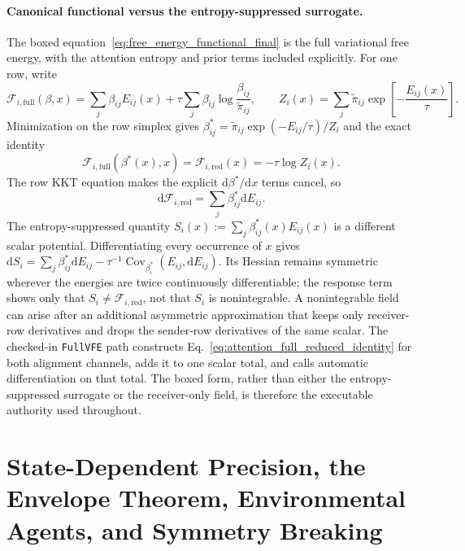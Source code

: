 \documentclass[11pt]{article}
\begin{document}
\paragraph{Canonical functional versus the entropy-suppressed surrogate.}
The boxed equation~\eqref{eq:free_energy_functional_final} is the full variational free energy, with the attention entropy and prior terms included explicitly. For one row, write
\begin{equation}
\mathcal{F}_{i,\mathrm{full}}(\beta,x)=\sum_j\beta_{ij}E_{ij}(x)+\tau\sum_j\beta_{ij}\log\frac{\beta_{ij}}{\tilde\pi_{ij}},
\qquad
Z_i(x)=\sum_j\tilde\pi_{ij}\exp\left[-\frac{E_{ij}(x)}{\tau}\right].
\label{eq:attention_full_reduced_identity}
\end{equation}
Minimization on the row simplex gives $\beta_{ij}^*=\tilde\pi_{ij}\exp(-E_{ij}/\tau)/Z_i$ and the exact identity
\begin{equation}
\mathcal{F}_{i,\mathrm{full}}(\beta^*(x),x)=\mathcal{F}_{i,\mathrm{red}}(x)=-\tau\log Z_i(x).
\label{eq:attention_full_equals_reduced}
\end{equation}
The row KKT equation makes the explicit $\mathrm{d}\beta^*/\mathrm{d}x$ terms cancel, so
\begin{equation}
\mathrm{d}\mathcal{F}_{i,\mathrm{red}}=\sum_j\beta_{ij}^*\mathrm{d}E_{ij}.
\label{eq:attention_envelope_differential}
\end{equation}
The entropy-suppressed quantity $S_i(x):=\sum_j\beta_{ij}^*(x)E_{ij}(x)$ is a different scalar potential. Differentiating every occurrence of $x$ gives $\mathrm{d}S_i=\sum_j\beta_{ij}^*\mathrm{d}E_{ij}-\tau^{-1}\operatorname{Cov}_{\beta_i^*}(E_{ij},\mathrm{d}E_{ij})$. Its Hessian remains symmetric wherever the energies are twice continuously differentiable; the response term shows only that $S_i\neq\mathcal{F}_{i,\mathrm{red}}$, not that $S_i$ is nonintegrable. A nonintegrable field can arise after an additional asymmetric approximation that keeps only receiver-row derivatives and drops the sender-row derivatives of the same scalar. The checked-in \texttt{FullVFE} path constructs Eq.~\eqref{eq:attention_full_reduced_identity} for both alignment channels, adds it to one scalar total, and calls automatic differentiation on that total. The boxed form, rather than either the entropy-suppressed surrogate or the receiver-only field, is therefore the executable authority used throughout.

\section{State-Dependent Precision, the Envelope Theorem, Environmental Agents, and Symmetry Breaking}\label{sec:precision_envelope}
\end{document}
